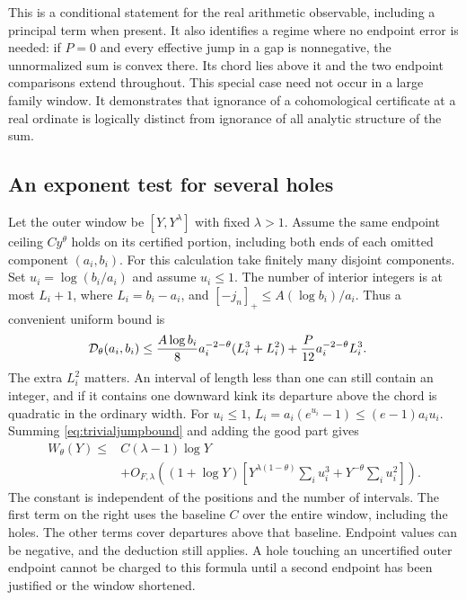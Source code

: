 \documentclass[12pt,letterpaper]{article}
\begin{document}
This is a conditional statement for the real arithmetic observable, including a principal term when present. It also identifies a regime where no endpoint error is needed: if \(P=0\) and every effective jump in a gap is nonnegative, the unnormalized sum is convex there. Its chord lies above it and the two endpoint comparisons extend throughout. This special case need not occur in a large family window. It demonstrates that ignorance of a cohomological certificate at a real ordinate is logically distinct from ignorance of all analytic structure of the sum.

\subsection{An exponent test for several holes}
Let the outer window be \([Y,Y^\lambda]\) with fixed \(\lambda>1\). Assume the same endpoint ceiling \(C y^\theta\) holds on its certified portion, including both ends of each omitted component \((a_i,b_i)\). For this calculation take finitely many disjoint components. Set \(u_i=\log(b_i/a_i)\) and assume \(u_i\le1\). The number of interior integers is at most \(L_i+1\), where \(L_i=b_i-a_i\), and \([-j_n]_+\le A(\log b_i)/a_i\). Thus a convenient uniform bound is
\begin{align}
 {\cal D}_\theta(a_i,b_i)\le {}&
 {A\log b_i\over8}a_i^{-2-\theta}(L_i^3+L_i^2)
 +{P\over12}a_i^{-2-\theta}L_i^3 .\label{eq:trivialjumpbound}
\end{align}
The extra \(L_i^2\) matters. An interval of length less than one can still contain an integer, and if it contains one downward kink its departure above the chord is quadratic in the ordinary width. For \(u_i\le1\), \(L_i=a_i(e^{u_i}-1)\le (e-1)a_i u_i\). Summing \eqref{eq:trivialjumpbound} and adding the good part gives
\begin{align}
 W_\theta(Y) \le {}& C(\lambda-1)\log Y \nonumber\\
 &+O_{F,\lambda}\!\left((1+\log Y)
   \left[Y^{\lambda(1-\theta)}\sum_i u_i^3
                       +Y^{-\theta}\sum_i u_i^2\right]\right).
 \label{eq:cubic}
\end{align}
The constant is independent of the positions and the number of intervals. The first term on the right uses the baseline \(C\) over the entire window, including the holes. The other terms cover departures above that baseline. Endpoint values can be negative, and the deduction still applies. A hole touching an uncertified outer endpoint cannot be charged to this formula until a second endpoint has been justified or the window shortened.
\end{document}
